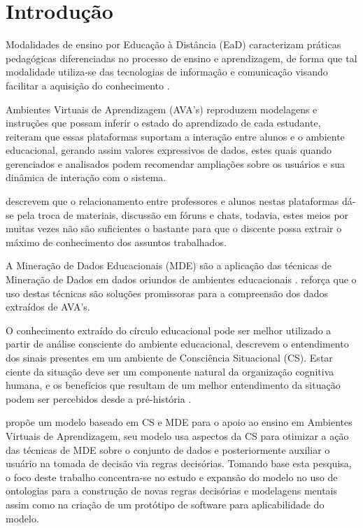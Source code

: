 \documentclass[
	oneside,
	12pt,				%
	a4paper,			%
	english,			%
	brazil,				%
	article
	]{abntex2}
\begin{document}
\section{Introdução}

Modalidades de ensino por Educação à Distância (EaD) caracterizam práticas pedagógicas diferenciadas no processo de ensino e aprendizagem, de forma que tal modalidade utiliza-se das tecnologias de informação e comunicação visando facilitar a aquisição do conhecimento \cite{Rabelo_et_al2017}.

Ambientes Virtuais de Aprendizagem (AVA’s) reproduzem modelagens e instruções que possam inferir o estado do aprendizado de cada estudante,  reiteram que essas plataformas suportam a interação entre alunos e o ambiente educacional, gerando assim valores expressivos de dados, estes quais quando gerenciados e analisados podem recomendar ampliações sobre os usuários e sua dinâmica de interação com o sistema.

 descrevem que o relacionamento entre professores e alunos nestas plataformas dá-se pela troca de materiais, discussão em fóruns e chats, todavia, estes meios por muitas vezes não são suficientes o bastante para que o discente possa extrair o máximo de conhecimento dos assuntos trabalhados.

A Mineração de Dados Educacionais (MDE) são a aplicação das técnicas de Mineração de Dados em dados oriundos de ambientes educacionais \cite{Romero_Ventura_2013}.  reforça que o uso destas técnicas são soluções promissoras para a compreensão dos dados extraídos de AVA's. 

O conhecimento extraído do círculo educacional pode ser melhor utilizado a partir de análise consciente do ambiente educacional,  descrevem o entendimento dos sinais presentes em um ambiente de Consciência Situacional (CS). Estar ciente da situação deve ser um componente natural da organização cognitiva humana, e os benefícios que resultam de um melhor entendimento da situação podem ser percebidos desde a pré-história \cite{Roy_Breton_Rousseau_2007}.

 propõe um modelo baseado em CS e MDE para o apoio ao ensino em Ambientes Virtuais de Aprendizagem, seu modelo usa aspectos da CS para otimizar a ação das técnicas de MDE sobre o conjunto de dados e posteriormente auxiliar o usuário na tomada de decisão via regras decisórias. Tomando base esta pesquisa, o foco deste trabalho concentra-se no estudo e expansão do modelo no uso de ontologias para a construção de novas regras decisórias e modelagens mentais assim como na criação de um protótipo de software para aplicabilidade do modelo.
\end{document}
